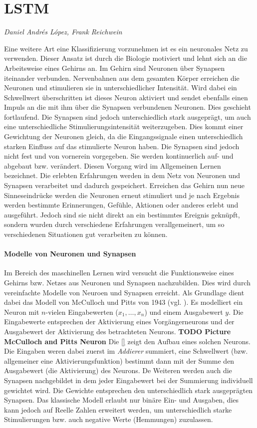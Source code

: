 \section{\acl{LSTM}}
\textit{Daniel Andrés López, Frank Reichwein}

Eine weitere Art eine Klassifizierung vorzunehmen ist es ein neuronales Netz zu
verwenden. Dieser Ansatz ist durch die Biologie motiviert und lehnt sich an die
Arbeitsweise eines Gehirns an. Im Gehirn sind Neuronen über Synapsen iteinander
verbunden. Nervenbahnen aus dem gesamten Körper erreichen die Neuronen und
stimulieren sie in unterschiedlicher Intensität. Wird dabei ein Schwellwert
überschritten ist dieses Neuron aktiviert und sendet ebenfalls einen Impuls an
die mit ihm über die Synapsen verbundenen Neuronen. Dies geschieht fortlaufend.
Die Synapsen sind jedoch unterschiedlich stark ausgeprägt, um auch eine
unterschiedliche Stimulierungsintensität weiterzugeben. Dies kommt einer
Gewichtung der Neuronen gleich, da die Eingangssignale einen unterschiedlich
starken Einfluss auf das stimulierte Neuron haben. Die Synapsen sind jedoch
nicht fest und von vornerein vorgegeben. Sie werden kontinuerlich auf- und
abgebaut bzw. verändert. Diesen Vorgang wird im Allgemeinen Lernen bezeichnet.
Die erlebten Erfahrungen werden in dem Netz von Neuronen und Synapsen
verarbeitet und dadurch gespeichert. Erreichen das Gehirn nun neue
Sinneseindrücke werden die Neuronen erneut stimuliert und je nach Ergebnis
werden bestimmte Erinnerungen, Gefühle, Aktionen oder anderes erlebt und
ausgeführt. Jedoch sind sie nicht direkt an ein bestimmtes Ereignis geknüpft,
sondern wurden durch verschiedene Erfahrungen verallgemeinert, um so
verschiedenen Situationen gut verarbeiten zu können. 

\paragraph{Modelle von Neuronen und Synapsen}
Im Bereich des maschinellen Lernen wird versucht die Funktionsweise eines
Gehirns bzw. Netzes aus Neuronen und Synapsen nachzubilden. Dies wird durch
vereinfachte Modelle von Neuroen und Synapsen erreicht. Als Grundlage dient
dabei das Modell von McCulloch und Pitts von 1943 (vgl. \cite{Mcc43}). Es
modelliert ein Neuron mit $n$-vielen Eingabewerten ($x_1,\ldots,x_n$) und einem
Ausgabewert $y$. Die Eingabewerte entsprechen der Aktivierung eines
Vorgängerneurons und der Ausgabewert der Aktivierung des betrachteten Neurons.
\textbf{TODO Picture McCulloch and Pitts Neuron} Die \autoref{} zeigt den Aufbau
eines solchen Neurons. Die Eingaben weren dabei zuerst im \textit{Addierer}
summiert, eine Schwellwert (bzw. allgemeiner eine Aktivierungsfunktion) bestimmt
dann mit der Summe den Ausgabewert (die Aktivierung) des Neurons. De Weiteren
werden auch die Synapsen nachgebildet in dem jeder Eingabewert bei der
Summierung individuell gewichtet wird. Die Gewichte entsprechen den
unterschiedlich stark ausgeprägten Synapsen. Das klassische Modell erlaubt nur
binäre Ein- und Ausgaben, dies kann jedoch auf Reelle Zahlen erweitert werden,
um unterschiedlich starke Stimulierungen bzw. auch negative Werte (Hemmungen)
zuzulassen.

